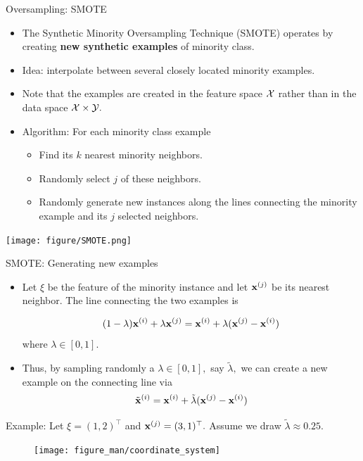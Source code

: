 \documentclass[11pt,compress,t,notes=noshow, xcolor=table]{beamer}
\begin{document}
	\begin{frame}{Oversampling: SMOTE}
		\footnotesize
		\begin{itemize}
			\item The Synthetic Minority Oversampling Technique (SMOTE) operates by creating \textbf{new synthetic examples} of minority class.

			\item Idea: interpolate between several closely located minority examples.

			\item Note that the examples are created in the feature space $\mathcal{X}$ rather than in the data space $\mathcal{X}\times\mathcal{Y}.$
	
			\item Algorithm: For each minority class example 

			\begin{itemize} 
                \footnotesize

				\item Find its $k$ nearest minority neighbors.
		
				\item Randomly select $j$ of these neighbors.
		
				\item Randomly generate new instances along the lines connecting the minority example and its $j$ selected neighbors.
		
			\end{itemize}

		\end{itemize}
%	
		\texttt{[image: figure/SMOTE.png]} 
	\end{frame}
	
	\begin{frame}{SMOTE: Generating new examples}
		\footnotesize
		
			\begin{itemize}
	
				\item Let $\xi$ be the feature of the minority instance and let $\mathbf{x}^{(j)}$ be its nearest neighbor. The line connecting the two examples is
				
				$$		(1-\lambda) \mathbf{x}^{(i)} + \lambda\mathbf{x}^{(j)} = \mathbf{x}^{(i)} + \lambda(\mathbf{x}^{(j)} - \mathbf{x}^{(i)})	$$
%				
				where $\lambda \in [0,1].$
				\item Thus, by sampling randomly a $\lambda \in [0,1],$ say $\tilde{\lambda},$ we can create a new example on the connecting line via
%				
				$$   \tilde{\mathbf{x}}^{(i)} =  \mathbf{x}^{(i)} + \tilde{\lambda}(\mathbf{x}^{(j)} - \mathbf{x}^{(i)})	 $$
			\end{itemize}		
				
				Example: Let $\xi = (1,2)^\top$ and $\mathbf{x}^{(j)} = (3,1)^\top.$ Assume we draw $\tilde{\lambda} \approx 0.25.$
			\begin{figure}
				\centering
				\texttt{[image: figure\_man/coordinate\_system]}
			\end{figure}
		
	\end{frame}
\end{document}
